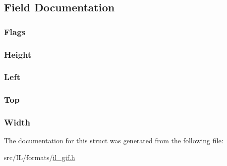 \subsection{Field Documentation}
\hypertarget{struct_gif_image_descriptor_a4d4e57f611ec63d5199ee6ea1c56077e}{
\subsubsection[{Flags}]{ Flags}}\label{struct_gif_image_descriptor_a4d4e57f611ec63d5199ee6ea1c56077e}
\hypertarget{struct_gif_image_descriptor_ab74e2bb7cc7272180be796817440ae4e}{
\subsubsection[{Height}]{ Height}}\label{struct_gif_image_descriptor_ab74e2bb7cc7272180be796817440ae4e}
\hypertarget{struct_gif_image_descriptor_aa8de2fde7de4d37142ae5c72c8a320f7}{
\subsubsection[{Left}]{ Left}}\label{struct_gif_image_descriptor_aa8de2fde7de4d37142ae5c72c8a320f7}
\hypertarget{struct_gif_image_descriptor_a8781a36554a66688b70b14f8261d701e}{
\subsubsection[{Top}]{ Top}}\label{struct_gif_image_descriptor_a8781a36554a66688b70b14f8261d701e}
\hypertarget{struct_gif_image_descriptor_aed0f0a923b8346ba51a4de45fff77ee7}{
\subsubsection[{Width}]{ Width}}\label{struct_gif_image_descriptor_aed0f0a923b8346ba51a4de45fff77ee7}


The documentation for this struct was generated from the following file\-:\begin{DoxyCompactItemize}
\item 
src/\-I\-L/formats/\hyperlink{il__gif_8h}{il\-\_\-gif.\-h}\end{DoxyCompactItemize}
